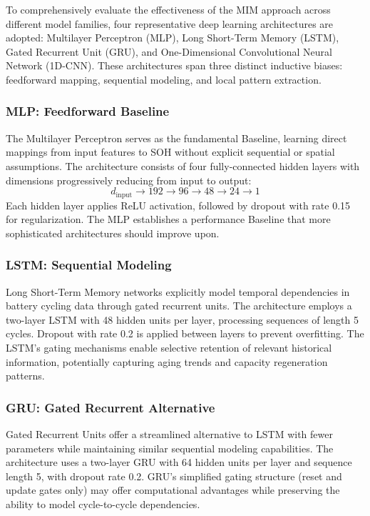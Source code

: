 \documentclass[5p,times]{elsarticle}
\begin{document}
To comprehensively evaluate the effectiveness of the MIM approach across different model families, four representative deep learning architectures are adopted: Multilayer Perceptron (MLP), Long Short-Term Memory (LSTM), Gated Recurrent Unit (GRU), and One-Dimensional Convolutional Neural Network (1D-CNN). These architectures span three distinct inductive biases: feedforward mapping, sequential modeling, and local pattern extraction.

\subsubsection{MLP: Feedforward Baseline}

The Multilayer Perceptron serves as the fundamental Baseline, learning direct mappings from input features to SOH without explicit sequential or spatial assumptions. The architecture consists of four fully-connected hidden layers with dimensions progressively reducing from input to output:
\begin{equation}
    d_{\text{input}} \rightarrow 192 \rightarrow 96 \rightarrow 48 \rightarrow 24 \rightarrow 1
\end{equation}
Each hidden layer applies ReLU activation, followed by dropout with rate 0.15 for regularization. The MLP establishes a performance Baseline that more sophisticated architectures should improve upon.

\subsubsection{LSTM: Sequential Modeling}

Long Short-Term Memory networks explicitly model temporal dependencies in battery cycling data through gated recurrent units. The architecture employs a two-layer LSTM with 48 hidden units per layer, processing sequences of length 5 cycles. Dropout with rate 0.2 is applied between layers to prevent overfitting. The LSTM's gating mechanisms enable selective retention of relevant historical information, potentially capturing aging trends and capacity regeneration patterns.

\subsubsection{GRU: Gated Recurrent Alternative}

Gated Recurrent Units offer a streamlined alternative to LSTM with fewer parameters while maintaining similar sequential modeling capabilities. The architecture uses a two-layer GRU with 64 hidden units per layer and sequence length 5, with dropout rate 0.2. GRU's simplified gating structure (reset and update gates only) may offer computational advantages while preserving the ability to model cycle-to-cycle dependencies.
\end{document}
